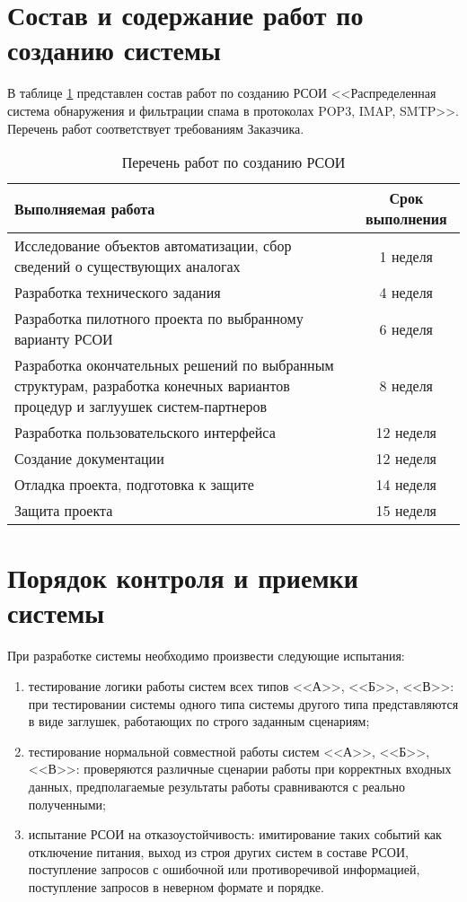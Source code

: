 \section{Состав и содержание работ по созданию системы}
В таблице \ref{tab:sostav} представлен состав работ по созданию РСОИ <<Распределенная система обнаружения и фильтрации спама в протоколах POP3, IMAP, SMTP>>. Перечень работ соответствует требованиям Заказчика.

\begin{table}[ht]
  \caption{Перечень работ по созданию РСОИ}
  \begin{tabular}{|p{}|c|}
  \hline
  Выполняемая работа & Срок выполнения\\
  \hline
  Исследование объектов автоматизации, сбор сведений о существующих аналогах & 1 неделя \\
  \hline
  Разработка технического задания & 4 неделя \\
  \hline
  Разработка пилотного проекта по выбранному варианту РСОИ & 6 неделя \\
  \hline
  Разработка окончательных решений по выбранным структурам, разработка конечных вариантов процедур и заглуушек систем-партнеров & 8 неделя \\
  \hline
  Разработка пользовательского интерфейса & 12 неделя \\ 
  \hline
   Создание документации & 12 неделя \\
  \hline
  Отладка проекта, подготовка к защите & 14 неделя \\
  \hline
  Защита проекта & 15 неделя\\
  \hline
  \end{tabular}
  \label{tab:sostav}
\end{table}


\section{Порядок контроля и приемки системы}
При разработке системы необходимо произвести следующие испытания:
\begin{enumerate}
	\item тестирование логики работы систем всех типов <<А>>, <<Б>>, <<В>>: при тестировании системы одного типа системы другого типа представляются в виде заглушек, работающих по строго заданным сценариям;
	\item тестирование нормальной совместной работы систем <<А>>, <<Б>>, <<В>>: проверяются различные сценарии работы при корректных входных данных, предполагаемые результаты работы сравниваются с реально полученными;
	\item испытание РСОИ на отказоустойчивость: имитирование таких событий как отключение питания, выход из строя других систем в составе РСОИ, поступление запросов с ошибочной или противоречивой информацией, поступление запросов в неверном формате и порядке.
\end{enumerate}


